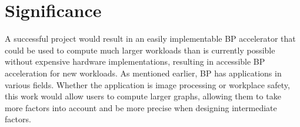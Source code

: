 \section*{Significance}

A successful project would result in an easily implementable BP accelerator that could be used to compute much larger workloads than is currently possible without expensive hardware implementations, resulting in accessible BP acceleration for new workloads. As mentioned earlier, BP has applications in various fields. Whether the application is image processing or workplace safety, this work would allow users to compute larger graphs, allowing them to take more factors into account and be more precise when designing intermediate factors.
